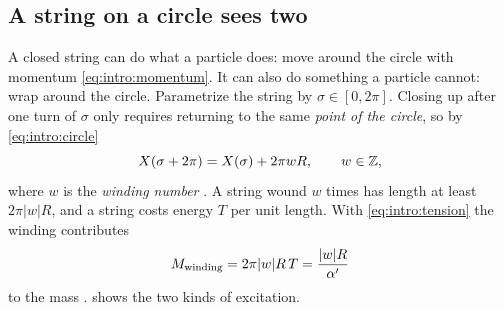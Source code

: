 \subsection{A string on a circle sees two}

A closed string can do what a particle does: move around the circle with momentum
\eqref{eq:intro:momentum}. It can also do something a particle cannot: wrap around the circle.
Parametrize the string by $\sigma\in[0,2\pi]$. Closing up after one turn of $\sigma$ only
requires returning to the same \emph{point of the circle}, so by \eqref{eq:intro:circle}
\begin{equation}\label{eq:intro:winding}
  X(\sigma+2\pi)=X(\sigma)+2\pi wR,\qquad w\in\mathbb{Z} ,
\end{equation}
where $w$ is the \emph{winding number}
. A string wound $w$ times has
length at least $2\pi|w|R$, and a string costs energy $T$ per unit length. With
\eqref{eq:intro:tension} the winding contributes
\begin{equation}\label{eq:intro:windingmass}
  M_{\text{winding}}=2\pi |w| R\,T=\frac{|w|R}{\alpha'}
\end{equation}
to the mass .  shows the two
kinds of excitation.

